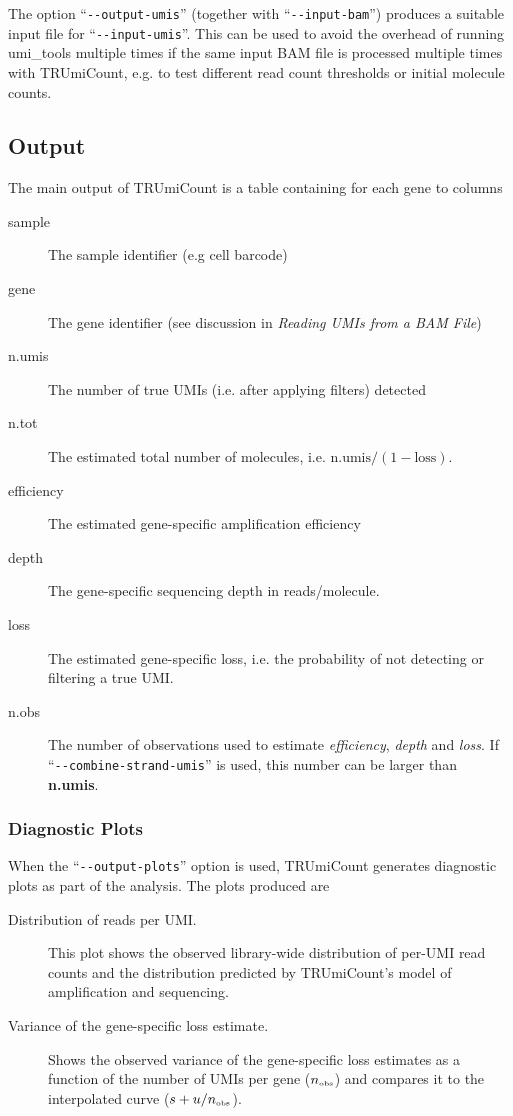 \documentclass[10pt]{article}
\newcommand{\ddarg}[1]{\texttt{-{}-#1}}
\begin{document}
The option ``\ddarg{output-umis}'' (together with ``\ddarg{input-bam}'') produces a suitable input file for ``\ddarg{input-umis}''. This can be used to avoid the overhead of running umi\_tools multiple times if the same input BAM file is processed multiple times with TRUmiCount, e.g. to test different read count thresholds or initial molecule counts.

\subsection{Output}

The main output of TRUmiCount is a table containing for each gene to columns
\begin{description}
\item[sample] The sample identifier (e.g cell barcode)
\item[gene] The gene identifier (see discussion in \textit{Reading UMIs from a BAM File})
\item[n.umis] The number of true UMIs (i.e. after applying filters) detected
\item[n.tot] The estimated total number of molecules, i.e. $\textrm{n.umis} / (1 - \textrm{loss})$.
\item[efficiency] The estimated gene-specific amplification efficiency
\item[depth] The gene-specific sequencing depth in reads/molecule.
\item[loss] The estimated gene-specific loss, i.e. the probability of not detecting or filtering a true UMI. 
\item[n.obs] The number of observations used to estimate \textit{efficiency}, \textit{depth} and \textit{loss}. If ``\ddarg{combine-strand-umis}'' is used, this number can be larger than \textbf{n.umis}.
\end{description}

\subsubsection*{Diagnostic Plots}

When the ``\ddarg{output-plots}'' option is used, TRUmiCount generates diagnostic plots as part of the analysis. The plots produced are

\begin{description}
\item[Distribution of reads per UMI.] This plot shows the observed library-wide distribution of per-UMI read counts and the distribution predicted by TRUmiCount's model of amplification and sequencing.

\item[Variance of the gene-specific loss estimate.] Shows the observed variance of the gene-specific loss estimates as a function of the number of UMIs per gene ($n_{\textrm{\tiny obs}}$) and compares it to the interpolated curve ($s + u / n_{\textrm{\tiny obs}}$).
\end{description}
\end{document}
